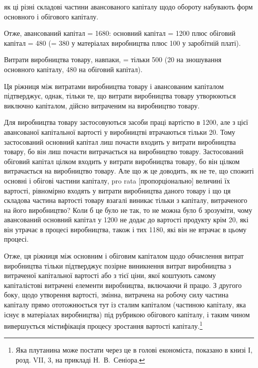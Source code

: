 \parcont{}  %
як ці різні складові частини авансованого капіталу щодо обороту
набувають форм основного і обігового капіталу.

Отже, авансований капітал = 1680: основний
капітал = 1200 плюс обіговий капітал =
480 (= 380 у матеріалах
виробництва плюс 100 у заробітній платі).

Витрати виробництва товару, навпаки, = тільки 500 (20 на зношування основного капіталу,
480 на обіговий капітал).

Ця ріжниця між витратами виробництва товару і авансованим
капіталом підтверджує, однак, тільки те, що витрати
виробництва товару утворюються виключно капіталом, дійсно
витраченим на виробництво товару.

Для виробництва товару застосовуються засоби праці вартістю
в 1200, але з цієї авансованої капітальної
вартості у виробництві втрачаються тільки 20. Тому застосований основний капітал лиш почасти
входить у витрати виробництва товару, бо він лиш почасти
витрачається на виробництво товару. Застосований обіговий
капітал цілком входить у витрати виробництва товару, бо він
цілком витрачається на виробництво товару. Але що ж це доводить,
як не те, що спожиті основні і обігові частини капіталу,
pro rata [пропорціонально] величині їх вартості, рівномірно
входять у витрати виробництва даного товару і що ця складова
частина вартості товару взагалі виникає тільки з капіталу,
витраченого на його виробництво? Коли б це було не так, то
не можна було б зрозуміти, чому авансований основний капітал
у 1200 не додає до вартості продукту крім
20, які він утрачає в процесі виробництва,
також і тих 1180, які він не втрачає в цьому
процесі.

Отже, ця ріжниця між основним і обіговим капіталом щодо
обчислення витрат виробництва тільки підтверджує позірне
виникнення витрат виробництва з витраченої капітальної вартості
або з тієї ціни, якої коштують самому капіталістові витрачені
елементи виробництва, включаючи й працю. З другого
боку, щодо утворення вартості, змінна, витрачена на робочу
силу частина капіталу прямо ототожнюється тут із сталим капіталом
(частиною капіталу, яка існує в матеріалах виробництва)
під рубрикою обігового капіталу, і таким чином вивершується
містифікація процесу зростання вартості капіталу.\footnote{
Яка плутанина може постати через це в голові економіста, показано
в книзі І, розд. VII, 3, на прикладі Н.~В.~Сеніора.
}

